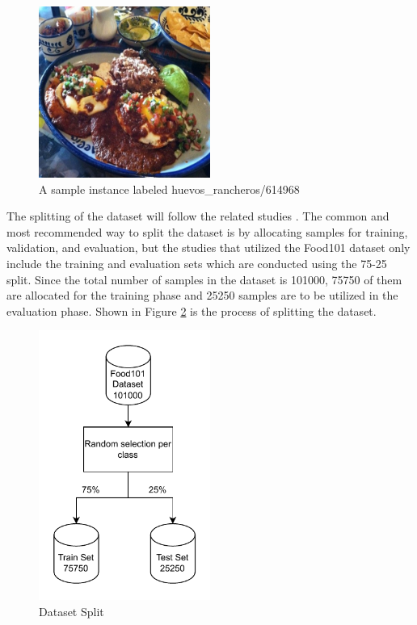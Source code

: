 \begin{figure}[h]
	\centering
	\includegraphics[width=0.5\textwidth]{graphics/images/sample_image.jpg}
	\caption{A sample instance labeled huevos\_rancheros/614968}
	\label{fig:sampleimg}
\end{figure}

The splitting of the dataset will follow the related studies \cite{pandey-2017,vijayakumari-2022,martinel-2018}. The common and most recommended way to split the dataset is by allocating samples for training, validation, and evaluation, but the studies that utilized the Food101 dataset only include the training and evaluation sets which are conducted using the 75-25 split. Since the total number of samples in the dataset is 101000, 75750 of them are allocated for the training phase and 25250 samples are to be utilized in the evaluation phase. Shown in Figure \ref{fig:dss} is the process of splitting the dataset. 

\begin{figure}[h]
	\centering
	\includegraphics[width=0.5\textwidth]{graphics/images/DatasetSplit.pdf}
	\caption{Dataset Split}
	\label{fig:dss}
\end{figure}

